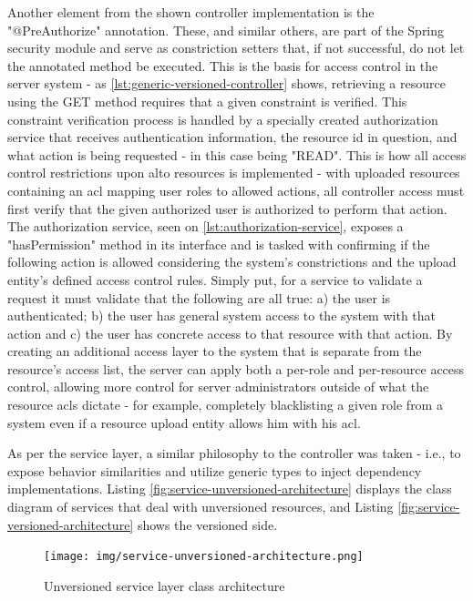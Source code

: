    Another element from the shown controller implementation is the "@PreAuthorize" annotation.
    These, and similar others, are part of the Spring security module and serve as constriction setters that, if not successful, do not let the annotated method be executed.
    This is the basis for access control in the server system - as \ref{lst:generic-versioned-controller} shows, retrieving a resource using the GET method requires that a given constraint is verified.
    This constraint verification process is handled by a specially created authorization service that receives authentication information, the resource id in question, and what action is being requested - in this case being "READ".
    This is how all access control restrictions upon \gls{alto} resources is implemented - with uploaded resources containing an \gls{acl} mapping user roles to allowed actions, all controller access must first verify that the given authorized user is authorized to perform that action.
    The authorization service, seen on \ref{lst:authorization-service}, exposes a "hasPermission" method in its interface and is tasked with confirming if the following action is allowed considering the system's constrictions and the upload entity's defined access control rules.
    Simply put, for a service to validate a request it must validate that the following are all true: a) the user is authenticated; b) the user has general system access to the system with that action and c) the user has concrete access to that resource with that action.
    By creating an additional access layer to the system that is separate from the resource's access list, the server can apply both a per-role and per-resource access control, allowing more control for server administrators outside of what the resource \gls{acls} dictate - for example, completely blacklisting a given role from a system even if a resource upload entity allows him with his \gls{acl}.

    As per the service layer, a similar philosophy to the controller was taken - i.e., to expose behavior similarities and utilize generic types to inject dependency implementations.
    Listing \ref{fig:service-unversioned-architecture} displays the class diagram of services that deal with unversioned resources, and Listing \ref{fig:service-versioned-architecture} shows the versioned side.

\begin{figure}[ht]
\centering
\texttt{[image: img/service-unversioned-architecture.png]}
\label{fig:controller-unversioned-architecture}
\caption{Unversioned service layer class architecture}
\end{figure}

